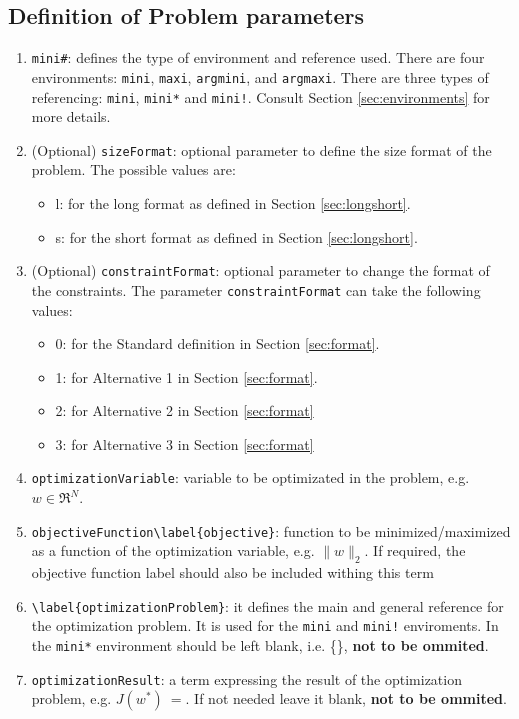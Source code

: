 \documentclass[a4paper]{article}
\begin{document}
\subsection{Definition of Problem parameters}

\begin{enumerate}[label=(\roman*)]
	\item \verb|mini#|: defines the type of environment and reference used. There are four environments: \verb|mini|, \verb|maxi|, \verb|argmini|, and \verb|argmaxi|. There are three types of referencing: \verb|mini|, \verb|mini*| and \verb|mini!|. Consult Section \ref{sec:environments} for more details. 
	\item (Optional) \verb|sizeFormat|: optional parameter to define the size format of the problem. The possible values are:
	\begin{itemize}
		\item l: for the long format as defined in Section \ref{sec:longshort}.
		\item s: for the short format as defined in Section \ref{sec:longshort}.
	\end{itemize}	
	\item (Optional) \verb|constraintFormat|: optional parameter to change the format of the constraints. The parameter \verb|constraintFormat| can take the following values: 
	\begin{itemize}
	\item 0: for the Standard definition in Section \ref{sec:format}.
	\item 1: for Alternative 1 in Section \ref{sec:format}.
	\item 2: for Alternative 2 in Section \ref{sec:format}
	\item 3: for Alternative 3 in Section \ref{sec:format}		
	\end{itemize}
	\item \verb|optimizationVariable|: variable to be optimizated in the problem, e.g. $w \in \Re^N$.
	\item \verb|objectiveFunction\label{objective}|: function to be minimized/maximized as a function of the optimization variable, e.g. $\|w\|_2$. If required, the objective function label should also be included withing this term
	\item \verb|\label{optimizationProblem}|: it defines the main and general reference for the optimization problem. It is used for the \verb|mini| and \verb|mini!| enviroments. In the \verb|mini*| environment should be left blank, i.e. \{\}, \textbf{not to be ommited}.
	\item \verb|optimizationResult|: a term expressing the result of the optimization problem, e.g. $J(w^*)~=$. If not needed leave it blank, \textbf{not to be ommited}.
\end{enumerate}
\end{document}
